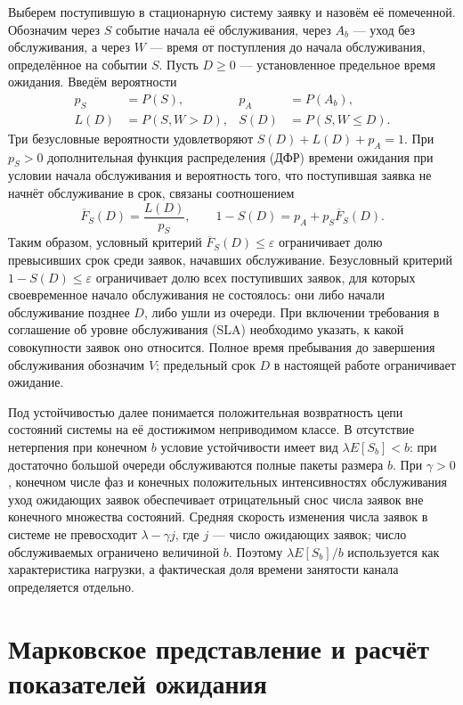 Выберем поступившую в стационарную систему заявку и назовём её помеченной. Обозначим через $S$ событие начала её обслуживания, через $A_b$ --- уход без обслуживания, а через $W$ --- время от поступления до начала обслуживания, определённое на событии $S$. Пусть $D\geq0$ --- установленное предельное время ожидания. Введём вероятности
\begin{align}
 p_S&=P(S), & p_A&=P(A_b),\\
 L(D)&=P(S,W>D), & S(D)&=P(S,W\leq D).
\end{align}
Три безусловные вероятности удовлетворяют $S(D)+L(D)+p_A=1$.
При $p_S>0$ дополнительная функция распределения (ДФР) времени ожидания при условии начала обслуживания и вероятность того, что поступившая заявка не начнёт обслуживание в срок, связаны соотношением
\begin{equation}\label{eq:sla}
 \overline F_S(D)=\frac{L(D)}{p_S},\qquad
 1-S(D)=p_A+p_S\overline F_S(D).
\end{equation}
Таким образом, условный критерий $\overline F_S(D)\leq\varepsilon$ ограничивает долю превысивших срок среди заявок, начавших обслуживание. Безусловный критерий $1-S(D)\leq\varepsilon$ ограничивает долю всех поступивших заявок, для которых своевременное начало обслуживания не состоялось: они либо начали обслуживание позднее $D$, либо ушли из очереди. При включении требования в соглашение об уровне обслуживания (SLA) необходимо указать, к какой совокупности заявок оно относится. Полное время пребывания до завершения обслуживания обозначим $V$; предельный срок $D$ в настоящей работе ограничивает ожидание.

Под устойчивостью далее понимается положительная возвратность цепи состояний системы на её достижимом неприводимом классе. В отсутствие нетерпения при конечном $b$ условие устойчивости имеет вид $\lambda E[S_b]<b$: при достаточно большой очереди обслуживаются полные пакеты размера $b$. При $\gamma>0$, конечном числе фаз и конечных положительных интенсивностях обслуживания уход ожидающих заявок обеспечивает отрицательный снос числа заявок вне конечного множества состояний. Средняя скорость изменения числа заявок в системе не превосходит $\lambda-\gamma j$, где $j$ --- число ожидающих заявок; число обслуживаемых ограничено величиной $b$. Поэтому $\lambda E[S_b]/b$ используется как характеристика нагрузки, а фактическая доля времени занятости канала определяется отдельно.

\section*{Марковское представление и расчёт показателей ожидания}

